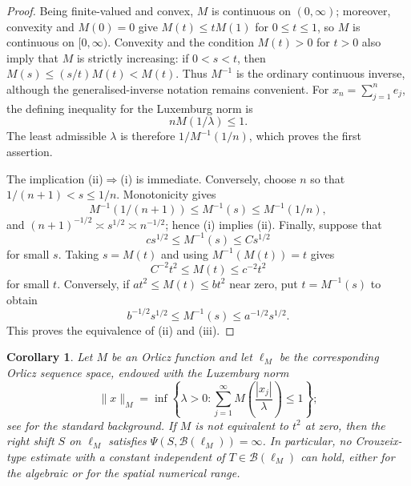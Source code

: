 \documentclass[a4paper]{amsart}
\newtheorem{corollary}[theorem]{Corollary}
\theoremstyle{remark}
\newcommand{\calB}{\mathcal B}
\begin{document}
\begin{proof}
Being finite-valued and convex, $M$ is continuous on $(0,\infty)$; moreover,
convexity and $M(0)=0$ give $M(t)\leqslant tM(1)$ for $0\leqslant t\leqslant1$,
so $M$ is continuous on $[0,\infty)$.  Convexity and the condition $M(t)>0$
for $t>0$ also imply that $M$ is strictly increasing: if $0<s<t$, then
$M(s)\leqslant(s/t)M(t)<M(t)$.  Thus $M^{-1}$ is the ordinary continuous
inverse, although the generalised-inverse notation remains convenient.  For \(x_n=\sum_{j=1}^n e_j\), the defining inequality for the Luxemburg norm is
\[
       nM(1/\lambda)\leqslant1.
\]
The least admissible \(\lambda\) is therefore \(1/M^{-1}(1/n)\), which proves the first assertion.

The implication \textup{(ii)}\(\Rightarrow\)\textup{(i)} is immediate.  Conversely,
choose \(n\) so that \(1/(n+1)<s\leqslant1/n\).  Monotonicity gives
\[
       M^{-1}(1/(n+1))\leqslant M^{-1}(s)
       \leqslant M^{-1}(1/n),
\]
and
\((n+1)^{-1/2}\asymp s^{1/2}\asymp n^{-1/2}\); hence
\textup{(i)} implies \textup{(ii)}.  Finally, suppose that
\[
       c s^{1/2}\leqslant M^{-1}(s)\leqslant C s^{1/2}
\]
for small \(s\).  Taking \(s=M(t)\) and using
\(M^{-1}(M(t))=t\) gives
\[
       C^{-2}t^2\leqslant M(t)\leqslant c^{-2}t^2
\]
for small \(t\).  Conversely, if
\(a t^2\leqslant M(t)\leqslant b t^2\) near zero, put
\(t=M^{-1}(s)\) to obtain
\[
       b^{-1/2}s^{1/2}\leqslant M^{-1}(s)
       \leqslant a^{-1/2}s^{1/2}.
\]
This proves the equivalence of \textup{(ii)} and \textup{(iii)}.
\end{proof}

\begin{corollary}\label{cor:orlicz}
Let \(M\) be an Orlicz function and let \(\ell_M\) be the corresponding
Orlicz sequence space, endowed with the Luxemburg norm
\[
       \|x\|_M=
       \inf\left\{\lambda>0:
       \sum_{j=1}^{\infty}M\!\left(\frac{|x_j|}{\lambda}\right)
       \leqslant1\right\};
\]
see \cite{Musielak} for the standard background.  If \(M\) is not equivalent
to \(t^2\) at zero, then the right shift \(S\) on \(\ell_M\) satisfies
\(\Psi(S,\calB(\ell_M))=\infty\).  In particular, no Crouzeix-type estimate
with a constant independent of \(T\in\calB(\ell_M)\) can hold, either for the
algebraic or for the spatial numerical range.
\end{corollary}
\end{document}
